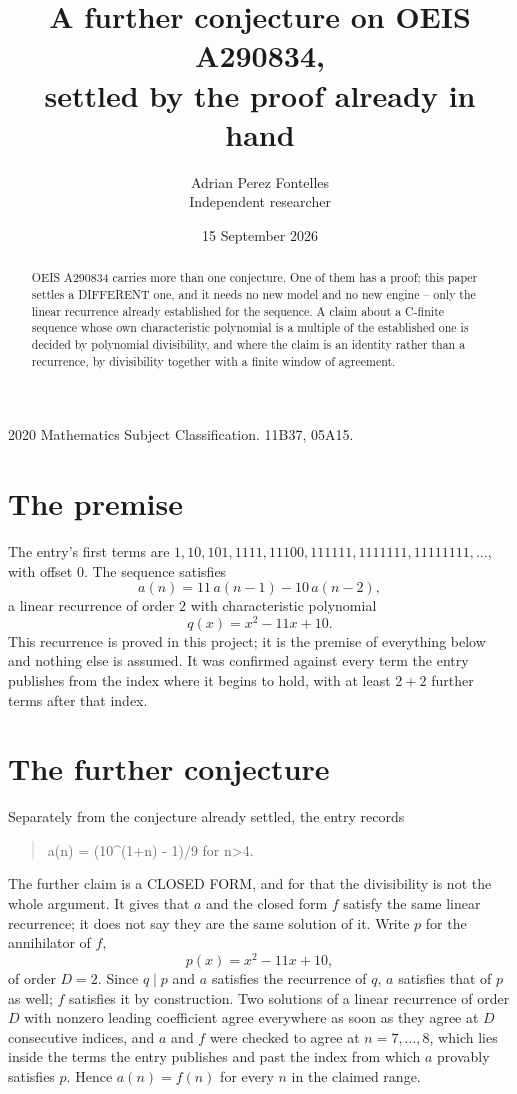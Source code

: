 \documentclass[11pt,a4paper]{article}
\title{A further conjecture on OEIS A290834,\\ \large settled by the proof already in hand}
\author{Adrian Perez Fontelles\\ \small Independent researcher}
\date{15 September 2026}
\theoremstyle{plain}
\theoremstyle{definition}
\begin{document}
\maketitle

\begin{abstract}
OEIS A290834 carries more than one conjecture. One of them has a proof; this paper settles a
DIFFERENT one, and it needs no new model and no new engine -- only the linear recurrence already
established for the sequence. A claim about a C-finite sequence whose own characteristic
polynomial is a multiple of the established one is decided by polynomial divisibility, and where
the claim is an identity rather than a recurrence, by divisibility together with a finite window
of agreement.
\end{abstract}

\noindent\small 2020 Mathematics Subject Classification. 11B37, 05A15.\normalsize

\section{The premise}

The entry's first terms are $1, 10, 101, 1111, 11100, 111111, 1111111, 11111111,\dots$, with offset $0$. The sequence satisfies
\[
  a(n)=11\,a(n-1) - 10\,a(n-2) ,
\]
a linear recurrence of order $2$ with characteristic polynomial
\[
  q(x)=x^{2} - 11 x + 10 .
\]
This recurrence is proved in this project; it is the premise of everything below and nothing else is assumed.
It was confirmed against every term the entry publishes from the index where it begins to hold,
with at least $2+2$ further terms after that index.

\section{The further conjecture}

Separately from the conjecture already settled, the entry records

\begin{quote}\raggedright a(n) = (10\^{}(1+n) - 1)/9 for n>4.\end{quote}

The further claim is a CLOSED FORM, and for that the divisibility is not the whole argument. It
gives that $a$ and the closed form $f$ satisfy the same linear recurrence; it does not say they
are the same solution of it. Write $p$ for the annihilator of $f$,
\[
  p(x)=x^{2} - 11 x + 10 ,
\]
of order $D=2$. Since $q\mid p$ and $a$ satisfies the recurrence of $q$, $a$ satisfies that of
$p$ as well; $f$ satisfies it by construction. Two solutions of a linear recurrence of order $D$
with nonzero leading coefficient agree everywhere as soon as they agree at $D$ consecutive
indices, and $a$ and $f$ were checked to agree at $n=7,\dots,8$,
which lies inside the terms the entry publishes and past the index from which $a$ provably
satisfies $p$. Hence $a(n)=f(n)$ for every $n$ in the claimed range.
\end{document}
